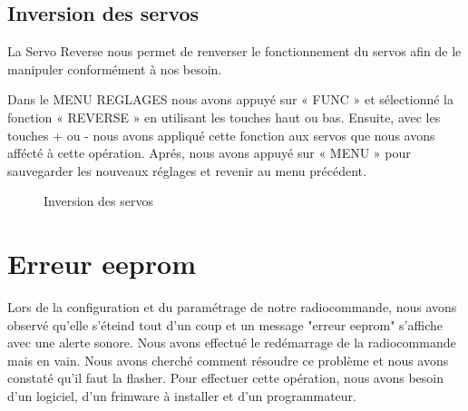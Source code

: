 	
	
	\subsection{Inversion des servos}
	La Servo Reverse nous permet de renverser le fonctionnement du servos afin de le manipuler conformément à nos besoin.
	
	
	
	Dans le MENU REGLAGES nous avons appuyé sur « FUNC » et sélectionné la fonction « REVERSE » en utilisant les touches haut ou bas. Ensuite, avec les touches + ou -
	nous avons appliqué cette fonction aux servos que nous avons affécté à cette opération. Aprés, nous avons appuyé sur « MENU » pour sauvegarder les nouveaux réglages et revenir au menu précédent.
	\begin{figure}[h]
		\begin{center}
			\centering
		\end{center}
		\caption{Inversion des servos}
	\end{figure}
	\section{Erreur eeprom}
	Lors de la configuration et du paramétrage de notre radiocommande, nous avons observé qu'elle s'éteind tout d'un coup et un message "erreur eeprom" s'affiche avec une alerte sonore. Nous avons effectué le redémarrage de la radiocommande mais en vain. Nous avons cherché comment résoudre ce problème et nous avons constaté qu'il faut la flasher. Pour effectuer cette opération, nous avons besoin d'un logiciel, d'un frimware à installer et d'un programmateur.
